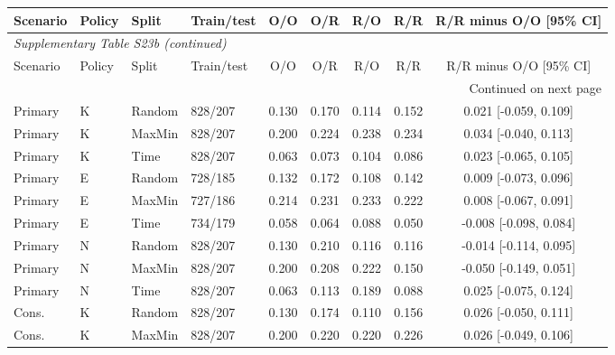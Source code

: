 \begin{longtable}{llllccccc}

\toprule Scenario & Policy & Split & Train/test & O/O & O/R & R/O & R/R & R/R minus O/O [95\% CI] \\ \midrule\endfirsthead

\multicolumn{9}{l}{\textit{Supplementary Table S23b (continued)}} \\

\toprule Scenario & Policy & Split & Train/test & O/O & O/R & R/O & R/R & R/R minus O/O [95\% CI] \\ \midrule\endhead

\midrule\multicolumn{9}{r}{Continued on next page}\\\endfoot\bottomrule\endlastfoot

Primary & K & Random & 828/207 & 0.130 & 0.170 & 0.114 & 0.152 & 0.021 [-0.059, 0.109] \\

Primary & K & MaxMin & 828/207 & 0.200 & 0.224 & 0.238 & 0.234 & 0.034 [-0.040, 0.113] \\

Primary & K & Time & 828/207 & 0.063 & 0.073 & 0.104 & 0.086 & 0.023 [-0.065, 0.105] \\

Primary & E & Random & 728/185 & 0.132 & 0.172 & 0.108 & 0.142 & 0.009 [-0.073, 0.096] \\

Primary & E & MaxMin & 727/186 & 0.214 & 0.231 & 0.233 & 0.222 & 0.008 [-0.067, 0.091] \\

Primary & E & Time & 734/179 & 0.058 & 0.064 & 0.088 & 0.050 & -0.008 [-0.098, 0.084] \\

Primary & N & Random & 828/207 & 0.130 & 0.210 & 0.116 & 0.116 & -0.014 [-0.114, 0.095] \\

Primary & N & MaxMin & 828/207 & 0.200 & 0.208 & 0.222 & 0.150 & -0.050 [-0.149, 0.051] \\

Primary & N & Time & 828/207 & 0.063 & 0.113 & 0.189 & 0.088 & 0.025 [-0.075, 0.124] \\

Cons. & K & Random & 828/207 & 0.130 & 0.174 & 0.110 & 0.156 & 0.026 [-0.050, 0.111] \\

Cons. & K & MaxMin & 828/207 & 0.200 & 0.220 & 0.220 & 0.226 & 0.026 [-0.049, 0.106] \\


\end{longtable}
